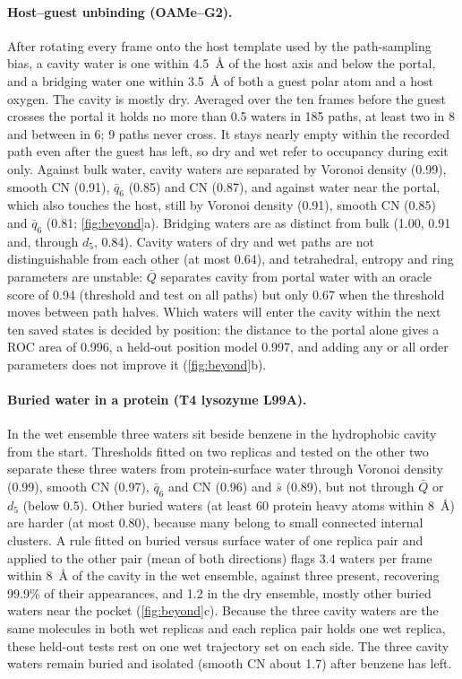 \documentclass[11pt,a4paper]{article}
\begin{document}
\paragraph{Host--guest unbinding (OAMe--G2).} After rotating every frame onto
the host template used by the path-sampling bias, a cavity water is one
within 4.5~\AA{} of the host axis and below the portal, and a bridging water
one within 3.5~\AA{} of both a guest polar atom and a host oxygen. The cavity
is mostly dry. Averaged over the ten frames before the guest crosses the
portal it holds no more than 0.5 waters in 185 paths, at least two in 8 and
between in 6; 9 paths never cross. It stays nearly empty within the
recorded path even after the guest has left, so dry and wet refer to
occupancy during exit only. Against bulk water, cavity waters are separated
by Voronoi density (0.99), smooth CN (0.91), $\bar q_6$ (0.85) and CN (0.87),
and against water near the portal, which also touches the host, still by
Voronoi density (0.91), smooth CN (0.85) and $\bar q_6$ (0.81;
\cref{fig:beyond}a). Bridging waters are as distinct from bulk (1.00, 0.91
and, through $d_5$, 0.84). Cavity waters of dry and wet paths are not
distinguishable from each other (at most 0.64), and tetrahedral, entropy and
ring parameters are unstable: $\bar Q$ separates cavity from portal water
with an oracle score of 0.94 (threshold and test on all paths) but only 0.67
when the threshold moves between path halves. Which waters will enter the cavity within the next ten saved states
is decided by position: the distance to the portal alone gives a ROC area of
0.996, a held-out position model 0.997, and adding any or all order
parameters does not improve it (\cref{fig:beyond}b).

\paragraph{Buried water in a protein (T4 lysozyme L99A).} In the wet
ensemble three waters sit beside benzene in the hydrophobic cavity from the
start. Thresholds fitted on two replicas and tested on the other two separate
these three waters from protein-surface water through Voronoi density
(0.99), smooth CN (0.97), $\bar q_6$ and CN (0.96) and $\bar s$ (0.89), but not
through $\bar Q$ or $d_5$ (below 0.5). Other buried waters (at least 60
protein heavy atoms within 8~\AA) are harder (at most 0.80), because many
belong to small connected internal clusters. A rule fitted on buried versus
surface water of one replica pair and applied to the other pair (mean of both
directions) flags 3.4 waters per frame within 8~\AA{} of the cavity in the wet
ensemble, against three present, recovering 99.9\% of their appearances,
and 1.2 in the dry ensemble, mostly other buried waters near the pocket
(\cref{fig:beyond}c). Because the three cavity waters are the same molecules
in both wet replicas and each replica pair holds one wet replica, these
held-out tests rest on one wet trajectory set on each side. The three cavity waters remain buried and
isolated (smooth CN about 1.7) after benzene has left.
\end{document}
